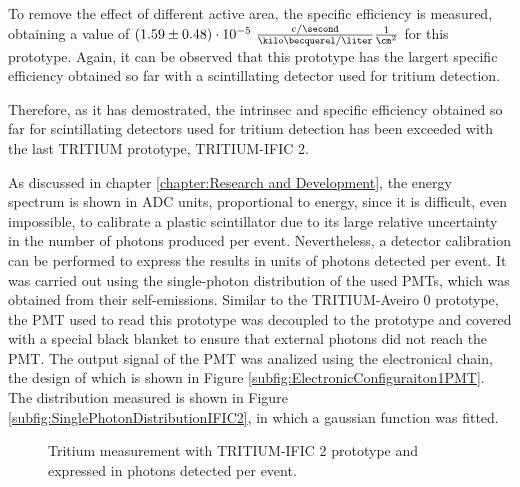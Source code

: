 To remove the effect of different active area, the specific efficiency is measured, obtaining a value of $(1.59 \pm 0.48)\cdot{} 10^{-5}~ \frac{\text{c}/\second}{\kilo\becquerel/\liter}\frac{1}{\cm^{2}}$ for this prototype. Again, it can be observed that this prototype has the largert specific efficiency obtained so far with a scintillating detector used for tritium detection.

Therefore, as it has demostrated, the intrinsec and specific efficiency obtained so far for scintillating detectors used for tritium detection has been exceeded with the last TRITIUM prototype, TRITIUM-IFIC 2.

As discussed in chapter \ref{chapter:Research and Development}, the energy spectrum is shown in ADC units, proportional to energy, since it is difficult, even impossible, to calibrate a plastic scintillator due to its large relative uncertainty in the number of photons produced per event. Nevertheless, a detector calibration can be performed to express the results in units of photons detected per event. It was carried out using the single-photon distribution of the used PMTs, which was obtained from their self-emissions. Similar to the TRITIUM-Aveiro 0 prototype, the PMT used to read this prototype was decoupled to the prototype and covered with a special black blanket to ensure that external photons did not reach the PMT. The output signal of the PMT was analized using the electronical chain, the design of which is shown in Figure \ref{subfig:ElectronicConfiguraiton1PMT}. The distribution measured is shown in Figure \ref{subfig:SinglePhotonDistributionIFIC2}, in which a gaussian function was fitted.

\begin{figure}[h]
 \centering
   \newline
 \caption{Tritium measurement with TRITIUM-IFIC 2 prototype and expressed in photons detected per event.}
 \label{fig:PhotonsPerTritiumEventIFIC2}
\end{figure}


